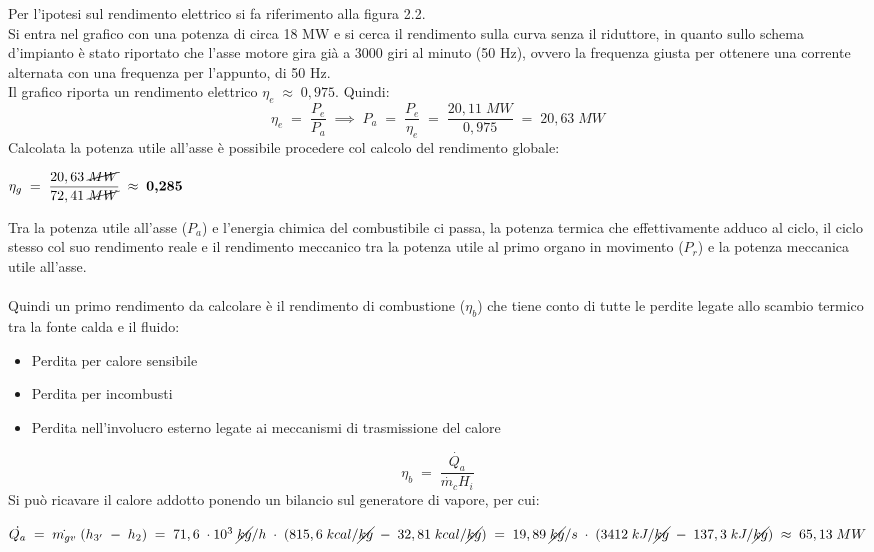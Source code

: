 \documentclass[a4paper, twoside, 12pt]{report}
\begin{document}
Per l'ipotesi sul rendimento elettrico si fa riferimento alla figura 2.2.\\
Si entra nel grafico con una potenza di circa 18 MW e si cerca il rendimento sulla curva senza il riduttore, in quanto sullo schema d'impianto è stato riportato che l'asse motore gira già a 3000 giri al minuto (50 Hz), ovvero la frequenza giusta per ottenere una corrente alternata con una frequenza per l'appunto, di 50 Hz. \\
Il grafico riporta un rendimento elettrico $\eta_{e}\;\approx\;0,975$. Quindi:
\begin{equation}
	\eta_{e}\;=\;\dfrac{P_{e}}{P_{a}}\;\implies\;{P_{a}}\;=\;\dfrac{P_{e}}{\eta_{e}}\;=\;\dfrac{20,11\;MW}{0,975}\;=\;20,63\;MW
\end{equation}
Calcolata la potenza utile all'asse è possibile procedere col calcolo del rendimento globale:
\begin{center}
	$\eta_{g}\;=\;\dfrac{20,63\;\cancel{MW}}{72,41\;\cancel{MW}}\;\approx\;\textbf{0,285}$
\end{center}
Tra la potenza utile all'asse ($P_{a}$) e l'energia chimica del combustibile ci passa, la potenza termica che effettivamente adduco al ciclo, il ciclo stesso col suo rendimento reale e il rendimento meccanico tra la potenza utile al primo organo in movimento ($P_{r}$) e la potenza meccanica utile all'asse.\\
\\Quindi un primo rendimento da calcolare è il rendimento di combustione ($\eta_{b}$) che tiene conto di tutte le perdite legate allo scambio termico tra la fonte calda e il fluido:
\begin{itemize}
	\item Perdita per calore sensibile
	\item Perdita per incombusti
	\item Perdita nell'involucro esterno legate ai meccanismi di trasmissione del calore
\end{itemize}
\begin{equation}
	\eta_{b}\;=\;\dfrac{\dot{Q_{a}}}{\dot{m_{c}}H_{i}}
\end{equation}
Si può ricavare il calore addotto ponendo un bilancio sul generatore di vapore, per cui:
\begin{center}
	$\dot{Q_{a}}\;=\;\dot{m_{gv}}\;(h_{3'}\;-\;h_{2})\;=\;71,6\;\cdot10^{3}\;\cancel{kg}/h\;\cdot\;(815,6\;kcal/\cancel{kg}\;-\;32,81\;kcal/\cancel{kg})\;=\;19,89\;\cancel{kg}/s\;\cdot\;(3412\;kJ/\cancel{kg}\;-\;137,3\;kJ/\cancel{kg})\;\approx\;65,13\;MW$
\end{center}
\end{document}
